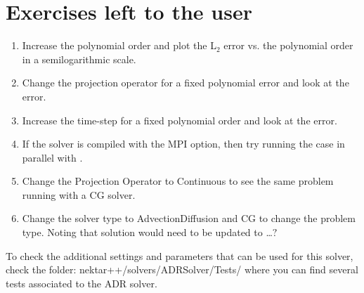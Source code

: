 \section{Exercises left to the user}
\begin{enumerate}
\item Increase the polynomial order and plot the L$_{2}$ error vs. the polynomial order 
in a semilogarithmic scale. 
\item Change the projection operator for a fixed polynomial error and look at the error.
\item Increase the time-step for a fixed polynomial order and look at the error.
\item If the solver is compiled with the MPI option, then try running the case in parallel 
with .
\item Change the Projection Operator to Continuous to see the same problem running 
with a CG solver.
\item Change the solver type to AdvectionDiffusion and CG to change the problem type. 
Noting that solution would need to be updated to \dots $?$
\end{enumerate}

\begin{tipbox}
To check the additional settings and parameters that can be used for this solver,
check the folder: \textsf{nektar++/solvers/ADRSolver/Tests/}
where you can find several tests associated to the ADR solver.
\end{tipbox}


